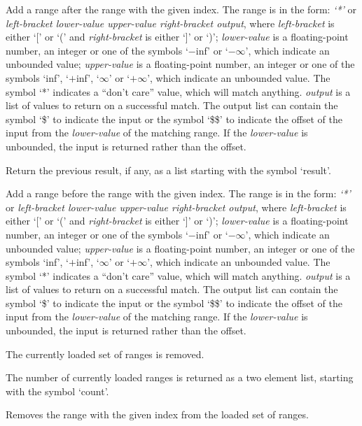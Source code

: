   Add a range after the range with the given index.
  The range is in the form: \emph{`*'} or \emph{left-bracket lower-value upper-value right-bracket output}, where
  \emph{left-bracket} is either `[' or `(' and \emph{right-bracket} is either `]' or `)';
  \emph{lower-value} is a floating-point number, an integer or one of the symbols `$-$inf' or
  `$-\infty$', which indicate an unbounded value;
  \emph{upper-value} is a floating-point number, an integer or one of the symbols
  `inf', `$+$inf', `$\infty$' or `$+\infty$', which indicate an unbounded value.
  The symbol `*' indicates a ``don't care'' value, which will match anything.
  \emph{output} is a list of values to return on a successful match.
  The output list can contain the symbol `\$' to indicate the input or the symbol `\$\$' to
  indicate the offset of the input from the \emph{lower-value} of the matching range.
  If the \emph{lower-value} is unbounded, the input is returned rather than the offset.

  Return the previous result, if any, as a list starting with the symbol `result'.

  Add a range before the range with the given index.
  The range is in the form: \emph{`*'} or \emph{left-bracket lower-value upper-value right-bracket output}, where
  \emph{left-bracket} is either `[' or `(' and \emph{right-bracket} is either `]' or `)';
  \emph{lower-value} is a floating-point number, an integer or one of the symbols `$-$inf' or
  `$-\infty$', which indicate an unbounded value;
  \emph{upper-value} is a floating-point number, an integer or one of the symbols
  `inf', `$+$inf', `$\infty$' or `$+\infty$', which indicate an unbounded value.
  The symbol `*' indicates a ``don't care'' value, which will match anything.
  \emph{output} is a list of values to return on a successful match.
  The output list can contain the symbol `\$' to indicate the input or the symbol `\$\$' to
  indicate the offset of the input from the \emph{lower-value} of the matching range.
  If the \emph{lower-value} is unbounded, the input is returned rather than the offset.

  The currently loaded set of ranges is removed.
  
  The number of currently loaded ranges is returned as a two element list, starting with the symbol
  `count'.
  
  Removes the range with the given index from the loaded set of ranges.

